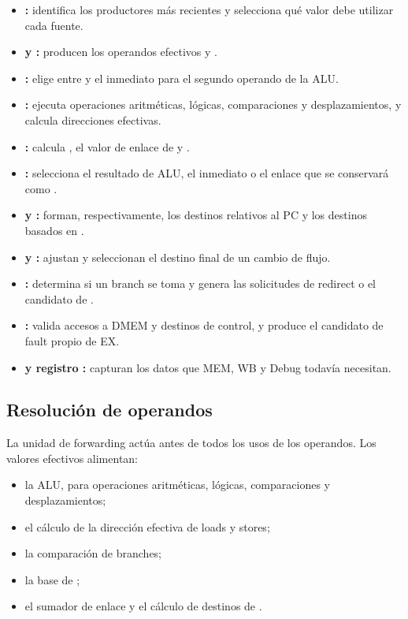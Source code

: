 \begin{itemize}
  \item \textbf{:} identifica los productores más
    recientes y selecciona qué valor debe utilizar cada fuente.
  \item \textbf{ y :} producen los
    operandos efectivos  y .
  \item \textbf{:} elige entre  y el
    inmediato para el segundo operando de la ALU.
  \item \textbf{:} ejecuta operaciones aritméticas, lógicas,
    comparaciones y desplazamientos, y calcula direcciones efectivas.
  \item \textbf{:} calcula , el valor de enlace
    de  y .
  \item \textbf{:} selecciona el resultado de ALU, el
    inmediato o el enlace que se conservará como .
  \item \textbf{ y :} forman,
    respectivamente, los destinos relativos al PC y los destinos basados en
    .
  \item \textbf{ y :} ajustan y seleccionan
    el destino final de un cambio de flujo.
  \item \textbf{:} determina si un branch se toma y genera
    las solicitudes de redirect o el candidato de .
  \item \textbf{:} valida accesos a DMEM y destinos de
    control, y produce el candidato de fault propio de EX.
  \item \textbf{ y registro :}
    capturan los datos que MEM, WB y Debug todavía necesitan.
\end{itemize}

\subsection{Resolución de operandos}

La unidad de forwarding actúa antes de todos los usos de los operandos. Los
valores efectivos alimentan:

\begin{itemize}
  \item la ALU, para operaciones aritméticas, lógicas, comparaciones y
    desplazamientos;
  \item el cálculo de la dirección efectiva de loads y stores;
  \item la comparación de branches;
  \item la base de ;
  \item el sumador de enlace y el cálculo de destinos de .
\end{itemize}

